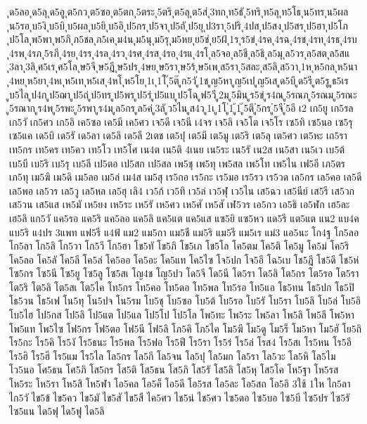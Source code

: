 {ุด5ลอ
ุด5ลุ
ุด5อู
ุต5กว
ุต5ซอ
ุต5ตก
ุ5ตระ
ุ5ตริ
ุต5ลุ
ุต5ส่
ุ3ทก
ุท5ธั
ุ5ทริ
ุท5ลุ
ุท5โธ
ุน5ทร
ุน5ผล
ุน5รอ
ุบ5งิ
ุบ5บิ
ุบ5ผล
ุบ5ยิ
ุบ5อิ
ุป5กร
ุป5จา
ุป5ถั
ุป5ยุ
ุป3รา
ุ5ปริ
ุ4ปส
ุป5สง
ุป5สร
ุป5ฮา
ุป5โภ
ุป5โล
ุพ5พา
ุพ5ภิ
ุภ5ชล
ุภ5เค
ุม4น
ุม5นุ
ุม5รุ
ุม5หย
ุย5ช่
ุย5ฝ้
ุ1ร
ุร5ข่
ุ4รค
ุ4รฉ
ุ4รช
ุ4รท
ุ4รธ
ุ4รบ
ุ4รพ
ุ4รภ
ุ5รภี
ุ4รย
ุ4รร
ุ4รล
ุ4รว
ุ4รศ
ุ4รส
ุ4รอ
ุ4รแ
ุ4รโ
ุล5จอ
ุล5ชี
ุล5ธิ
ุล5มุ
ุล5วร
ุล5สต
ุล5สแ
ุ3ลา
ุ3ลิ
ุศ5เร
ุศ5โล
ุษ5จี
ุษ5ฎี
ุษ5ปร
ุ4ษย
ุษ5รา
ุษ5ร้
ุษ5เพ
ุส5รา
ุ5สละ
ุส5ลิ
ุส5วา
ุ1ห
ุห5กล
ุห5นา
ุ4หย
ุห5ยา
ุ4หเ
ุห5เท
ุห5เส
ุ4หโ
ุห5โย
ุ1เ
ุ1โ
ุ๊5ต๊
ูก5วั
ู1ช
ูญ5หา
ูญ5เป
ูญ5เส
ูด5บึ
ูด5รี
ูต5รู
ูธ5เร
ูบ5ไล
ูป4ก
ูป5ฌา
ูป5ถ่
ูป5ทร
ูป5พร
ูป5ร่
ูป5แบ
ูป5โฉ
ูฟ5วี
ู2ม
ู5มิน
ูร5ข่
ูร4ณ
ู5รณภ
ู5รณม
ู5รณะ
ู5รณาก
ูร4พ
ู5รพะ
ู5รพา
ูร4ม
ูล5กร
ูล5ค่
ู3ลั
ูว5ไน
ูส4ว
ู1เ
ู1โ
ู่1
ู้1
ู๊5ตึ
ู๋5กร
ู๋5จี
ู๋5อี
เ2
เก5ยู
เก5รล
เก5วั
เก5ศว
เก5อิ
เค5ซอ
เค5มี
เค5ศว
เจ5ดี
เจ5นี
เ4จร
เจ5ลิ
เจ5โต
เจ5โร
เซ5ทิ
เซ5นอ
เซ5รุ
เซ5แค
เด5บิ
เด5รั
เด5ลา
เด5ลิ
เด5ลี
2เตช
เต5ปุ
เต5มี
เต5มู
เต5ริ
เต5ลุ
เต5ศว
เต5หะ
เถ5รา
เท5กร
เท5คร
เท5คว
เท5โว
เท5โศ
เน4ต
เน5ติ
4เนย
เน5ระ
เน5รั
เน2ส
เน5สา
เน5เว
เบ5ต้
เบ5บี
เบ5ริ
เบ5รุ
เบ5ลี
เป5ตอ
เป5สก
เป5สล
เพ5ชุ
เพ5ทุ
เพ5สล
เพ5โท
เพ5ไน
เฟ5อี
เภ5ตร
เภ5ทุ
เม5ฆิ
เม5ดิ
เม5ลอ
เม5ล่
เม4ส
เม5สุ
เร5กอ
เร5กะ
เร5มอ
เร5รว
เร5วด
เล5กร
เล5คอ
เล5ดี
เล5พอ
เล5วร
เล5วู
เล5หล
เล5ฮุ
เลิ4
เว5ก้
เว5ทิ
เว5ล่
เว5ฬุ
เว5ไน
เส5ฉว
เส5นีย์
เส5รี
เส5วก
เส5วน
เส5แส
เห5มั
เห5ยง
เห5ระ
เห5รั
เห5ศว
เห5ศั
เห5สั
เฬ5วร
เอ5กว
เอ5ธิ
เอ5ฬก
เฮ5ละ
เฮ5ลิ
แก5วั
แค5รอ
แค5ริ
แค5ลอ
แค5ลิ
แค5แต
แค5แส
แซ5ยิ
แซ5หว
แด5รี
แต5แต
แน2
แบ4ค
แบ5ริ
แ4ปร
3แพท
แฟ5รี
แ4ฟ้
แม2
แม5กา
แม5ชี
แม5ริ
แม5รี
แม5เร
แม่3
แอ5นะ
โก4ฐ
โก5ลอ
โก5ลา
โก5ลิ
โก5วา
โก5วี
โก5ฮา
โข5ทั
โข5ภิ
โข5เภ
โข5โล
โค5ตม
โค5ติ
โค5มู
โค5ม่
โค5ริ
โค5ลอ
โค5ลั
โค5ลี
โค5ล่
โค5ออ
โค5อะ
โค5แท
โค5ไซ
โจ5ปก
โจ5อี
โฉ5เบ
โช5ฎึ
โช5ดึ
โช5ห่
โซ5กร
โซ5นี
โซ5ยู
โซ5ลู
โซ5สเ
โญ4ช
โญ5ปว
โด5จี
โด5นี
โด5รา
โด5ลิ
โต5กร
โต5รอ
โต5รา
โต5ริ
โต5ลิ
โต5สเ
โต5ไค
โท5กร
โท5คอ
โท5ดอ
โท5พล
โท5รอ
โท5แอ
โธ5ทน
โธ5ปก
โธ5ปิ
โธ5วน
โธ5เฟ
โน5ทุ
โน5ปจ
โน5รม
โบ5ชุ
โบ5ซอ
โบ5ต้
โบ5รอ
โบ5รั
โบ5รา
โบ5ลิ
โบ5ล่
โบ5อิ
โบ5ไฮ
โป5กส
โป5ลิ
โป5แต
โป5แล
โป5โป
โป5โล
โพ5ทะ
โพ5ระ
โพ5ลา
โพ5ลิ
โพ5ลี
โพ5หา
โพ5แท
โพ5ไซ
โฟ5กร
โฟ5ตอ
โฟ5นี
โฟ5ลิ
โภ5คิ
โภ5ไค
โม5ฆี
โม5ดู
โม5ร็
โม5หา
โม5ฮั
โย5ถิ
โร5กะ
โร5คิ
โร5งั
โร5ธนะ
โร5พล
โร5ฟอ
โร5ฟี
โร5รา
โร5ร่
โร5ล่
โรส4
โร5สเ
โร5หน
โร5อี
โร5ฮิ
โร5ฮี
โร5แม
โร5ไล
โล5กร
โล5กี
โล5จน
โล5ปุ
โล5มก
โล5รา
โล5วะ
โล5หิ
โล5ไม
โว5นอ
โศ5ธน
โศ5ภิ
โส5กร
โส5ติ
โส5ธน
โส5ภิ
โส5รั
โส5ลิ
โส5หุ
โส5โค
โห5ฐา
โห5รส
โห5ระ
โห5รา
โห5สิ
โห5ฬา
โอ5คล
โอ5ค็
โอ5ดี
โอ5รส
โอ5ละ
โอ5สถ
โอ5อิ
3ใช้
1ให
ไก5ลา
ไก5วั
ไข5ข้
ไข5คว
ไข5มั
ไข5สั
ไข5สื
ไค5ศว
ไช5น่
ไช5ศว
ไซ5ดอ
ไซ5บอ
ไซ5บี
ไซ5ปร
ไซ5รั
ไซ5แน
ได5ฟุ
ได5ฟู
ได5ลิ
}
